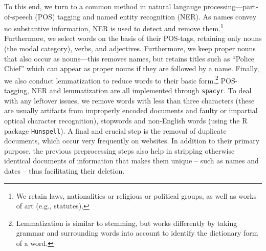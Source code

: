 \documentclass[11pt]{article}
\begin{document}

To this end, we turn to a common method in natural langauge processing---part-of-speech (POS) tagging and named entity recognition (NER). As names convey no substantive information, NER is used to detect and remove them.\footnote{We retain laws, nationalities or religious or political groups, as well as works of art (e.g., statutes).} Furthermore, we select words on the basis of their POS-tags, retaining only nouns (the modal category), verbs, and adjectives. Furthermore, we keep proper nouns that also occur as nouns---this removes names, but retains titles such as ``Police Chief'' which can appear as proper nouns if they are followed by a name. Finally, we also conduct lemmatization to reduce words to their basic form.\footnote{Lemmatization is similar to stemming, but works differently by taking grammar and surrounding words into account to identify the dictionary form of a word. } POS-tagging, NER and lemmatization are all implemented through \texttt{spacyr}. To deal with any leftover issues, we remove words with less than three characters (these are usually artifacts from improperly encoded documents and faulty or impartial optical character recognition), stopwords and non-English words (using the R package \texttt{Hunspell}).  A final and crucial step is the removal of duplicate documents, which occur very frequently on websites. In addition to their primary purpose, the previous preprocessing steps also help in stripping otherwise identical documents of information that makes them unique -- such as names and dates -- thus facilitating their deletion. %
\end{document}
